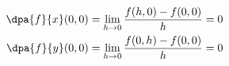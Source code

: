 {\begin{enumerate}
{		\begin{align*}
		\dpa{f}{x}(0,0) &= \lim\limits_{h \to 0} \frac{f(h,0)-f(0,0)}{h} = 0  \\
		\dpa{f}{y}(0,0) &= \lim\limits_{h \to 0} \frac{f(0,h)-f(0,0)}{h} = 0  
		\end{align*}	
	}
\end{enumerate}}
